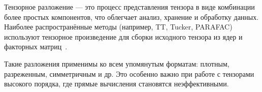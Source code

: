 Тензорное разложение — это процесс представления тензора в виде комбинации более простых компонентов, что облегчает анализ, хранение и обработку данных. Наиболее распространённые методы (например, TT, Tucker, PARAFAC) используют тензорное произведение для сборки исходного тензора из ядер и факторных матриц~\cite{tensorly_parafac_tucker}.

Такие разложения применимы ко всем упомянутым форматам: плотным, разреженным, симметричным и др. Это особенно важно при работе с тензорами высокого порядка, где прямые вычисления становятся неэффективными.

